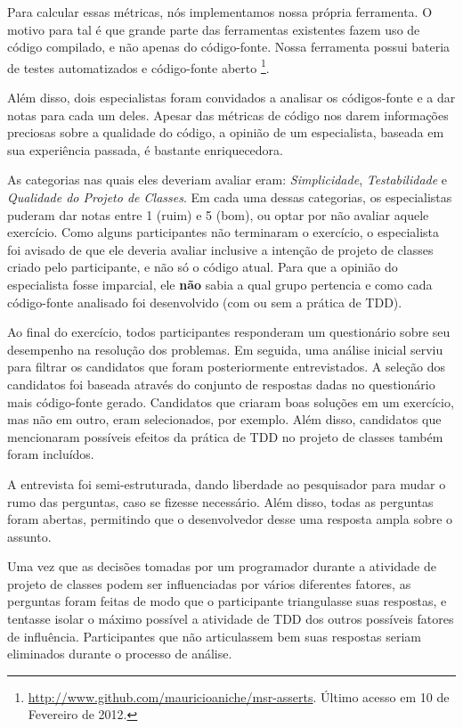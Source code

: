 \documentclass[conference]{IEEEtran}
\begin{document}
Para calcular essas
métricas, nós implementamos nossa própria ferramenta. O motivo para tal é que
grande parte das ferramentas existentes fazem uso de código compilado, e não
apenas do código-fonte. Nossa ferramenta possui bateria de testes automatizados
e código-fonte aberto \footnote{\url{http://www.github.com/mauricioaniche/msr-asserts}. 
Último acesso em 10 de Fevereiro de 2012.}.

Além disso, dois especialistas foram convidados a analisar os códigos-fonte e a dar notas para cada
um deles. Apesar das métricas de código nos darem informações
preciosas sobre a qualidade do código, a opinião de um especialista, baseada
em sua experiência passada, é bastante enriquecedora.

As categorias nas quais eles deveriam avaliar eram: \textit{Simplicidade}, \textit{Testabilidade} e
\textit{Qualidade do Projeto de Classes}.
Em cada uma dessas categorias, os especialistas puderam dar notas entre
1 (ruim) e 5 (bom), ou optar por não avaliar aquele exercício.
Como alguns participantes não terminaram o exercício, o especialista
foi avisado de que ele deveria avaliar inclusive a intenção de projeto de classes criado
pelo participante, e não só o código atual. 
Para que a opinião do especialista fosse imparcial, ele \textbf{não} sabia a qual grupo
pertencia e como cada código-fonte analisado foi desenvolvido (com ou sem a prática de TDD).

Ao final do exercício, todos participantes
responderam um questionário sobre seu desempenho na resolução dos problemas.
Em seguida, uma análise inicial serviu para filtrar os candidatos
que foram posteriormente entrevistados. A seleção dos candidatos foi baseada
através do conjunto de respostas dadas no questionário mais código-fonte gerado. Candidatos
que criaram boas soluções em um exercício, mas não em outro, eram selecionados, por exemplo.
Além disso, candidatos que mencionaram possíveis efeitos da prática de TDD no projeto de classes
também foram incluídos.

A entrevista foi semi-estruturada, dando liberdade ao
pesquisador para mudar o rumo das perguntas, caso se fizesse necessário.
Além disso, todas as perguntas foram abertas, permitindo que o desenvolvedor desse
uma resposta ampla sobre o assunto.

Uma vez que as decisões tomadas por um programador durante a atividade de projeto de classes
podem ser influenciadas por vários diferentes fatores, 
as perguntas foram feitas de modo que o participante triangulasse suas respostas,
e tentasse isolar o máximo possível a atividade de TDD dos outros possíveis fatores
de influência. Participantes que não articulassem bem suas respostas seriam eliminados
durante o processo de análise.
\end{document}
